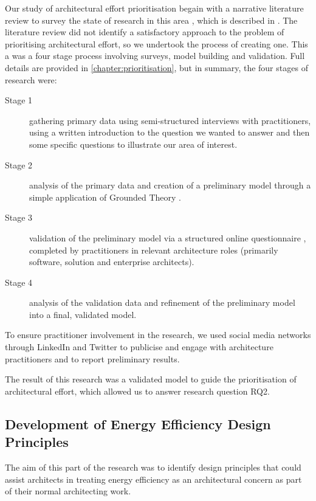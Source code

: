 Our study of architectural effort prioritisation begain with a narrative literature review to survey the state of research in this area \cite{baumeister1997-narrativereviews}, which is described in .  The literature review did not identify a satisfactory approach to the problem of prioritising architectural effort, so we undertook the process of creating one.  This a was a four stage process involving surveys, model building and validation.  Full details are provided in \cref{chapter:prioritisation}, but in summary, the four stages of research were:
\begin{description}
	\item [Stage 1] gathering primary data using semi-structured interviews with practitioners, using a written introduction to the question we wanted to answer and then some specific questions to illustrate our area of interest. 
	\item [Stage 2] analysis of the primary data and creation of a preliminary model through a simple application of Grounded Theory \cite{charmaz2006-groundedtheory}.
	\item [Stage 3] validation of the preliminary model via a structured online questionnaire \cite{gillham2000-questionnaire}, completed by practitioners in relevant architecture roles (primarily software, solution and enterprise architects).
	\item [Stage 4] analysis of the validation data and refinement of the preliminary model into a final, validated model.
\end{description}

To ensure practitioner involvement in the research, we used social media networks through LinkedIn and Twitter to publicise and engage with architecture practitioners and to report preliminary results.

The result of this research was a validated model to guide the prioritisation of architectural effort, which allowed us to answer research question RQ2.

\subsection{Development of Energy Efficiency Design Principles}

The aim of this part of the research was to identify design principles that could assist architects in treating energy efficiency as an architectural concern as part of their normal architecting work.

